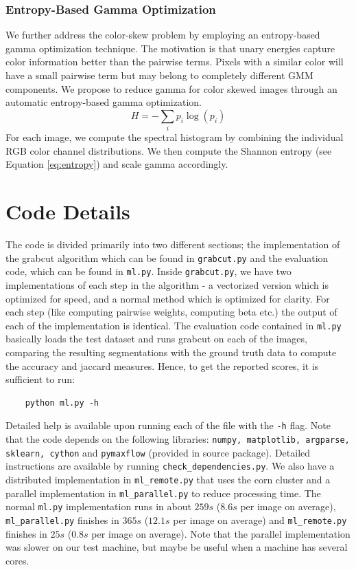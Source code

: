 \documentclass[10pt,twocolumn,letterpaper]{article}
\begin{document}
\subsubsection{Entropy-Based Gamma Optimization}

We further address the color-skew problem by employing an entropy-based gamma optimization technique. The motivation is that unary energies capture color information better than the pairwise terms. Pixels with a similar color will have a small pairwise term but may belong to completely different GMM components. We propose to reduce gamma for color skewed images through an automatic entropy-based gamma optimization.
\begin{equation}\label{eq:entropy}
H = -\sum_{i} p_i \log(p_i)
\end{equation}
For each image, we compute the spectral histogram by combining the individual RGB color channel distributions. We then compute the Shannon entropy \cite{shannon2001mathematical} (see Equation \ref{eq:entropy}) and scale gamma accordingly.


\section{Code Details}\label{sec:code}
The code is divided primarily into two different sections; the implementation of the grabcut algorithm which can be found in \texttt{grabcut.py} and the evaluation code, which can be found in \texttt{ml.py}. Inside \texttt{grabcut.py}, we have two implementations of each step in the algorithm - a vectorized version which is optimized for speed, and a normal method which is optimized for clarity. For each step (like computing pairwise weights, computing beta etc.) the output of each of the implementation is identical. The evaluation code contained in \texttt{ml.py} basically loads the test dataset and runs grabcut on each of the images, comparing the resulting segmentations with the ground truth data to compute the accuracy and jaccard measures. Hence, to get the reported scores, it is sufficient to run:
\begin{verbatim}
    python ml.py -h
\end{verbatim}
Detailed help is available upon running each of the file with the \texttt{-h} flag. Note that the code depends on the following libraries: \texttt{numpy, matplotlib, argparse, sklearn, cython} and \texttt{pymaxflow} (provided in source package). Detailed instructions are available by running \texttt{check\_dependencies.py}.
We also have a distributed implementation in \texttt{ml\_remote.py} that uses the corn cluster and a parallel implementation in \texttt{ml\_parallel.py} to reduce processing time. The normal \texttt{ml.py} implementation runs in about $259s$ ($8.6s$ per image on average), \texttt{ml\_parallel.py} finishes in $365s$ ($12.1s$ per image on average) and \texttt{ml\_remote.py} finishes in $25s$ ($0.8s$ per image on average). Note that the parallel implementation was slower on our test machine, but maybe be useful when a machine has several cores. 
\end{document}
